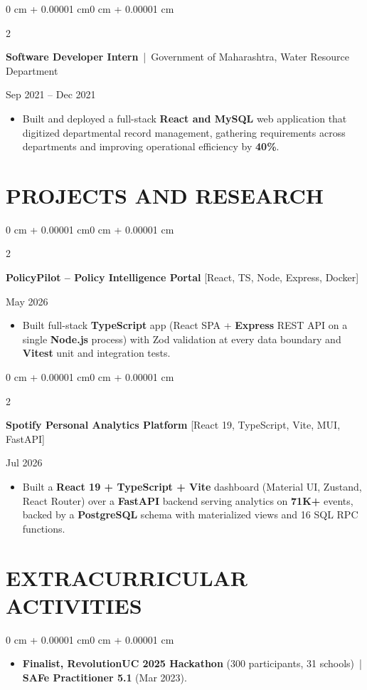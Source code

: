 \documentclass[10pt, letterpaper]{article}
\newenvironment{highlights}{
    \begin{itemize}[
        topsep=0.10 cm,
        parsep=0.06 cm,
        partopsep=0pt,
        itemsep=0.06 cm,
        leftmargin=12pt
    ]
}{
    \end{itemize}
}
\newenvironment{onecolentry}{
    \begin{adjustwidth}{0 cm + 0.00001 cm}{0 cm + 0.00001 cm}
}{
    \end{adjustwidth}
}
\newenvironment{twocolentry}[2][]{
    \onecolentry
    \def\secondColumn{#2}
    \setcolumnwidth{\fill, 4.5 cm}
    \begin{paracol}{2}
}{
    \switchcolumn \raggedleft \secondColumn
    \end{paracol}
    \endonecolentry
}
\begin{document}
\vspace{0.15 cm}

\begin{twocolentry}{Sep 2021 -- Dec 2021}
\textbf{Software Developer Intern} \,|\, Government of Maharashtra, Water Resource Department
\end{twocolentry}
\begin{highlights}
  \item Built and deployed a full-stack \textbf{React and MySQL} web application that digitized departmental record management, gathering requirements across departments and improving operational efficiency by \textbf{40\%}.
\end{highlights}

\section{PROJECTS AND RESEARCH}
\begin{twocolentry}{May 2026}
\textbf{PolicyPilot -- Policy Intelligence Portal} [React, TS, Node, Express, Docker]
\end{twocolentry}
\begin{highlights}
  \item Built full-stack \textbf{TypeScript} app (React SPA + \textbf{Express} REST API on a single \textbf{Node.js} process) with Zod validation at every data boundary and \textbf{Vitest} unit and integration tests.
\end{highlights}

\vspace{0.12 cm}

\begin{twocolentry}{Jul 2026}
\textbf{Spotify Personal Analytics Platform} [React 19, TypeScript, Vite, MUI, FastAPI]
\end{twocolentry}
\begin{highlights}
  \item Built a \textbf{React 19 + TypeScript + Vite} dashboard (Material UI, Zustand, React Router) over a \textbf{FastAPI} backend serving analytics on \textbf{71K+} events, backed by a \textbf{PostgreSQL} schema with materialized views and 16 SQL RPC functions.
\end{highlights}

\section{EXTRACURRICULAR ACTIVITIES}
\begin{onecolentry}
\begin{highlights}
  \item \textbf{Finalist, RevolutionUC 2025 Hackathon} (300 participants, 31 schools) \,|\, \textbf{SAFe Practitioner 5.1} (Mar 2023).
\end{highlights}
\end{onecolentry}
\end{document}
